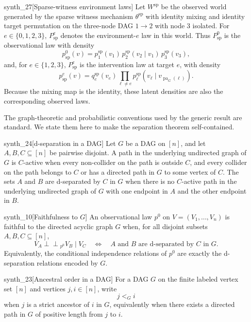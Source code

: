 \documentclass[11pt]{article}
\begin{document}
\begin{definitionv}{synth_27}[Sparse-witness environment laws]
Let \(W^{\mathrm{sp}}\) be the observed world generated by the sparse witness mechanism \(\theta^{\mathrm{sp}}\) with identity mixing and identity target permutation on the three-node DAG \(1\to2\) with node \(3\) isolated. For \(e\in\{0,1,2,3\}\), \(P^e_{\mathrm{sp}}\) denotes the environment-\(e\) law in this world. Thus \(P^0_{\mathrm{sp}}\) is the observational law with density
\[
p^0_{\mathrm{sp}}(v)
=
p^{\mathrm{sp}}_1(v_1)\,
p^{\mathrm{sp}}_2(v_2\mid v_1)\,
p^{\mathrm{sp}}_3(v_3),
\]
and, for \(e\in\{1,2,3\}\), \(P^e_{\mathrm{sp}}\) is the intervention law at target \(e\), with density
\[
p^e_{\mathrm{sp}}(v)
=
q^{\mathrm{sp}}_e(v_e)
\prod_{\ell\ne e}
p^{\mathrm{sp}}_\ell(v_\ell\mid v_{\operatorname{pa}_G(\ell)}).
\]
Because the mixing map is the identity, these latent densities are also the corresponding observed laws.
\end{definitionv}

The graph-theoretic and probabilistic conventions used by the generic result are standard. We state them here to make the separation theorem self-contained.

\begin{definitionv}{synth_24}[d-separation in a DAG]
Let \(G\) be a DAG on \([n]\), and let \(A,B,C\subseteq[n]\) be pairwise disjoint. A path in the underlying undirected graph of \(G\) is \(C\)-active when every non-collider on the path is outside \(C\), and every collider on the path belongs to \(C\) or has a directed path in \(G\) to some vertex of \(C\). The sets \(A\) and \(B\) are d-separated by \(C\) in \(G\) when there is no \(C\)-active path in the underlying undirected graph of \(G\) with one endpoint in \(A\) and the other endpoint in \(B\).
\end{definitionv}

\begin{definitionv}{synth_10}[Faithfulness to \(G\)]
An observational law \(p^0\) on \(V=(V_1,\ldots,V_n)\) is faithful to the directed acyclic graph \(G\) when, for all disjoint subsets \(A,B,C\subseteq[n]\),
\[
V_A\mathbin{\perp\!\!\!\perp}_{p^0} V_B \mid V_C
\quad\Longleftrightarrow\quad
A \text{ and } B \text{ are d-separated by } C \text{ in } G .
\]
Equivalently, the conditional independence relations of \(p^0\) are exactly the d-separation relations encoded by \(G\).
\end{definitionv}

\begin{definitionv}{synth_23}[Ancestral order in a DAG]
For a DAG \(G\) on the finite labeled vertex set \([n]\) and vertices \(j,i\in[n]\), write
\[
j<_G i
\]
when \(j\) is a strict ancestor of \(i\) in \(G\), equivalently when there exists a directed path in \(G\) of positive length from \(j\) to \(i\).
\end{definitionv}
\end{document}
